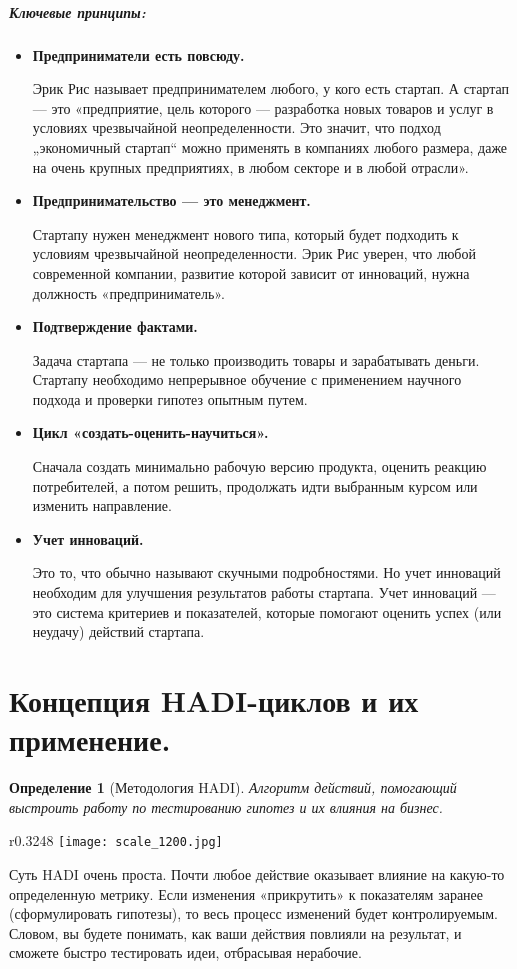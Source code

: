 \documentclass[11pt]{article}
\theoremstyle{plain} %
\newtheorem{proposition}[theorem]{Определение}
\theoremstyle{definition} %
\theoremstyle{remark} %
\begin{document}
\subparagraph{Ключевые принципы:}
\begin{itemize}
	\item \textbf{Предприниматели есть повсюду.}

	Эрик Рис называет предпринимателем любого, у кого есть стартап. А стартап — это «предприятие, цель которого — разработка новых товаров и услуг в условиях чрезвычайной неопределенности. Это значит, что подход „экономичный стартап“ можно применять в компаниях любого размера, даже на очень крупных предприятиях, в любом секторе и в любой отрасли».
	\item \textbf{Предпринимательство — это менеджмент.}

	Стартапу нужен менеджмент нового типа, который будет подходить к условиям чрезвычайной неопределенности. Эрик Рис уверен, что любой современной компании, развитие которой зависит от инноваций, нужна должность «предприниматель».
	\item \textbf{Подтверждение фактами.}

	Задача стартапа — не только производить товары и зарабатывать деньги. Стартапу необходимо непрерывное обучение с применением научного подхода и проверки гипотез опытным путем.
	\item \textbf{Цикл «создать-оценить-научиться».}

	Сначала создать минимально рабочую версию продукта, оценить реакцию потребителей, а потом решить, продолжать идти выбранным курсом или изменить направление.
	\item \textbf{Учет инноваций.}

	Это то, что обычно называют скучными подробностями. Но учет инноваций необходим для улучшения результатов работы стартапа. Учет инноваций — это система критериев и показателей, которые помогают оценить успех (или неудачу) действий стартапа.
\end{itemize}

\newpage

\section{Концепция HADI-циклов и их применение.}\label{erste}

\begin{proposition}[Методология HADI]
	Алгоритм действий, помогающий выстроить работу по тестированию гипотез и их влияния на бизнес.
\end{proposition}

\begin{wrapfigure}{r}{0.3248\linewidth}
	\texttt{[image: scale\_1200.jpg]}
	\caption{HADI-Цикол}
\end{wrapfigure}
Суть HADI очень проста. Почти любое действие оказывает влияние на какую-то определенную метрику. Если изменения «прикрутить» к показателям заранее (сформулировать гипотезы), то весь процесс изменений будет контролируемым. Словом, вы будете понимать, как ваши действия повлияли на результат, и сможете быстро тестировать идеи, отбрасывая нерабочие.
\end{document}
